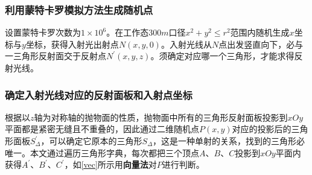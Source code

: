 \documentclass{cumcmthesis}
\begin{document}
\subsubsection{利用蒙特卡罗模拟方法生成随机点}
设置蒙特卡罗次数为$1 \times 10^6$。在工作态$300m$口径$x^2 + y^2 \leq r^2$范围内随机生成$x$坐标与$y$坐标，获得入射光出射点$N(x,y,0)$。入射光线从$N$点出发竖直向下，必与一三角形反射面交于反射点$N^{\prime}(x,y,z)$。须确定对应哪一个三角形，才能求得反射光线。
\subsubsection{确定入射光线对应的反射面板和入射点坐标}
根据以$z$轴为对称轴的抛物面的性质，抛物面中所有的三角形反射面板投影到$xOy$平面都是紧密无缝且不重叠的，因此通过二维随机点$P(x,y)$对应的投影后的三角形面板$S_{\Delta}^{\prime}$，可以确定它原本的三角形$S_{\Delta}$，这是一种单射的关系，找到的三角形必唯一。本文通过遍历三角形字典，每次都把三个顶点$A$、$B$、$C$投影到$xOy$平面内获得$A^{\prime}$、$B^{\prime}$、$C^{\prime}$，如\cref{vec}所示用\textbf{向量法}对$P$进行判断。
\end{document}
